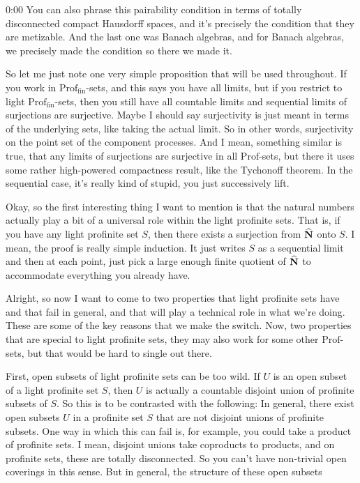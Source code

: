 \begin{unfinished}{0:00}
You can also phrase this pairability condition in terms of totally disconnected compact Hausdorff spaces, and it's precisely the condition that they are metizable. And the last one was Banach algebras, and for Banach algebras, we precisely made the condition so there we made it.

So let me just note one very simple proposition that will be used throughout. If you work in $\text{Prof}_{\text{fin}}$-sets, and this says you have all limits, but if you restrict to light $\text{Prof}_{\text{fin}}$-sets, then you still have all countable limits and sequential limits of surjections are surjective. Maybe I should say surjectivity is just meant in terms of the underlying sets, like taking the actual limit. So in other words, surjectivity on the point set of the component processes. And I mean, something similar is true, that any limits of surjections are surjective in all $\text{Prof}$-sets, but there it uses some rather high-powered compactness result, like the Tychonoff theorem. In the sequential case, it's really kind of stupid, you just successively lift.

Okay, so the first interesting thing I want to mention is that the natural numbers actually play a bit of a universal role within the light profinite sets. That is, if you have any light profinite set $S$, then there exists a surjection from $\widehat{\mathbf N}$ onto $S$. I mean, the proof is really simple induction. It just writes $S$ as a sequential limit and then at each point, just pick a large enough finite quotient of $\widehat{\mathbf N}$ to accommodate everything you already have.

Alright, so now I want to come to two properties that light profinite sets have and that fail in general, and that will play a technical role in what we're doing. These are some of the key reasons that we make the switch. Now, two properties that are special to light profinite sets, they may also work for some other $\text{Prof}$-sets, but that would be hard to single out there.

First, open subsets of light profinite sets can be too wild. If $U$ is an open subset of a light profinite set $S$, then $U$ is actually a countable disjoint union of profinite subsets of $S$. So this is to be contrasted with the following: In general, there exist open subsets $U$ in a profinite set $S$ that are not disjoint unions of profinite subsets. One way in which this can fail is, for example, you could take a product of profinite sets. I mean, disjoint unions take coproducts to products, and on profinite sets, these are totally disconnected. So you can't have non-trivial open coverings in this sense. But in general, the structure of these open subsets


\end{unfinished}
